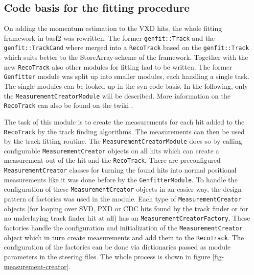 \subsection{Code basis for the fitting procedure}

On adding the momentum estimation to the VXD hits, the whole fitting framework in basf2 was rewritten. The former \texttt{genfit::Track} and the \texttt{genfit::TrackCand} where merged into a \texttt{RecoTrack} based on the \texttt{genfit::Track} which suits better to the StoreArray-scheme of the framework. Together with the new \texttt{RecoTrack} also other modules for fitting had to be written. The former \texttt{Genfitter} module was split up into smaller modules, each handling a single task. The single modules can be looked up in the svn code basis. In the following, only the \texttt{MeasurementCreatorModule} will be described. More information on the \texttt{RecoTrack} can also be found on the twiki \cite{twiki-recotrack}.

The task of this module is to create the measurements for each hit added to the \texttt{RecoTrack} by the track finding algorithms. The measurements can then be used by the track fitting routine. The \texttt{MeasurementCreatorModule} does so by calling configurable \texttt{MeasurementCreator} objects on all hits which can  create a measurement out of the hit and the \texttt{RecoTrack}. There are preconfigured \texttt{MeasurementCreator} classes for turning the found hits into normal positional measurements like it was done before by the \texttt{GenfitterModule}. To handle the configuration of these \texttt{MeasurementCreator} objects in an easier way, the design pattern of factories was used in the module. Each type of \texttt{MeasurementCreator} objects (for looping over SVD, PXD or CDC hits found by the track finder or for no underlaying track finder hit at all) has an \texttt{MeasurementCreatorFactory}. These factories handle the configuration and initialization of the \texttt{MeasurementCreator} object which in turn create measurements and add them to the \texttt{RecoTrack}. The configuration of the factories can be done via dictionaries passed as module parameters in the steering files. The whole process is shown in figure \ref{fig-measurement-creator}.

